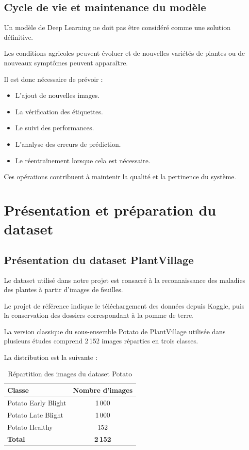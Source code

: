 \documentclass[12pt,a4paper,oneside]{report}
\begin{document}
\section{Cycle de vie et maintenance du modèle}

Un modèle de Deep Learning ne doit pas être considéré
comme une solution définitive.

Les conditions agricoles peuvent évoluer et de nouvelles
variétés de plantes ou de nouveaux symptômes peuvent
apparaître.

Il est donc nécessaire de prévoir :

\begin{itemize}
    \item L'ajout de nouvelles images.
    \item La vérification des étiquettes.
    \item Le suivi des performances.
    \item L'analyse des erreurs de prédiction.
    \item Le réentraînement lorsque cela est nécessaire.
\end{itemize}

Ces opérations contribuent à maintenir la qualité
et la pertinence du système.


\chapter{Présentation et préparation du dataset}

\section{Présentation du dataset PlantVillage}

Le dataset utilisé dans notre projet est consacré
à la reconnaissance des maladies des plantes à partir
d'images de feuilles.

Le projet de référence indique le téléchargement des
données depuis Kaggle, puis la conservation des dossiers
correspondant à la pomme de terre.

La version classique du sous-ensemble Potato de PlantVillage
utilisée dans plusieurs études comprend 2\,152 images
réparties en trois classes.

La distribution est la suivante :

\begin{table}[H]
\centering
\caption{Répartition des images du dataset Potato}
\begin{tabular}{lc}
\toprule
\textbf{Classe} & \textbf{Nombre d'images}\\
\midrule
Potato Early Blight & 1\,000\\
Potato Late Blight & 1\,000\\
Potato Healthy & 152\\
\midrule
\textbf{Total} & \textbf{2\,152}\\
\bottomrule
\end{tabular}
\end{table}
\end{document}

